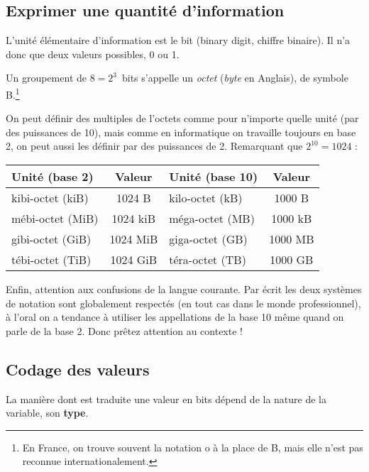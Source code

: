 \subsection{Exprimer une quantité d'information}
L'unité élémentaire d'information est le bit (binary digit, chiffre binaire). Il n'a donc que deux valeurs possibles, 0 ou 1. 

Un groupement de $8=2^3$~bits s'appelle un \emph{octet} (\emph{byte} en Anglais), de symbole B.\footnote{En France, on trouve souvent la notation o à la place de B, mais elle n'est pas reconnue internationalement.}

On peut définir des multiples de l'octets comme pour n'importe quelle unité (par des puissances de 10), mais comme en informatique on travaille toujours en base 2, on peut aussi les définir par des puissances de 2. Remarquant que $2^{10}= 1024$ :
\begin{center}
\begin{tabular}{lc|lc}
Unité (base 2) & Valeur & Unité (base 10) & Valeur\\
\hline
kibi-octet (kiB) & 1024 B & kilo-octet (kB) & 1000 B\\
mébi-octet (MiB) & 1024 kiB & méga-octet (MB) & 1000 kB\\
gibi-octet (GiB) & 1024 MiB & giga-octet (GB) & 1000 MB\\
tébi-octet (TiB) & 1024 GiB & téra-octet (TB) & 1000 GB
\end{tabular}
\end{center}
Enfin, attention aux confusions de la langue courante. Par écrit les deux systèmes de notation sont globalement respectés (en tout cas dans le monde professionnel), à l'oral on a tendance à utiliser les appellations de la base 10 même quand on parle de la base 2. Donc prêtez attention au contexte !
\subsection{Codage des valeurs}
La manière dont est traduite une valeur en bits dépend de la nature de la variable, son {\bf type}. 

